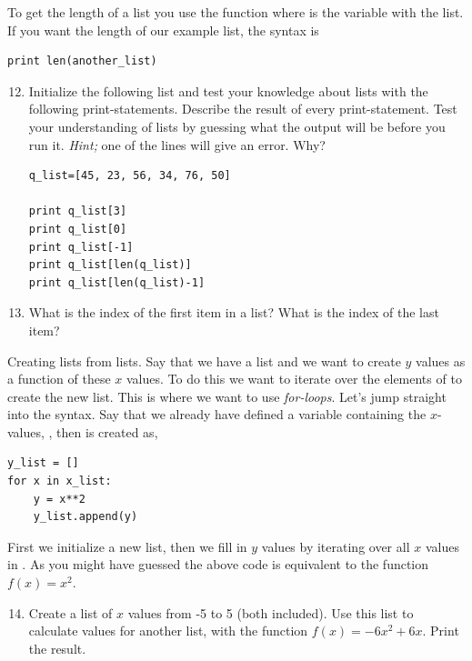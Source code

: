 \documentclass{article}
\begin{document}
To get the length of a list you use the function 
where  is the variable with the list.
If you want the length of our example list, the syntax is

\begin{lstlisting}
print len(another_list)
\end{lstlisting}


\begin{enumerate}
  \setcounter{enumi}{11}
  \item Initialize the following list and test your knowledge about
    lists with the following print-statements.
    Describe the result of every print-statement. Test your
    understanding of lists by guessing what the output will be before
    you run it. 
    {\em Hint;} one of the lines will give an error. Why?

\begin{lstlisting}
q_list=[45, 23, 56, 34, 76, 50]

print q_list[3]
print q_list[0]
print q_list[-1]
print q_list[len(q_list)]
print q_list[len(q_list)-1]
\end{lstlisting}

  \item What is the index of the first item in a list? What is the index of
    the last item?

\end{enumerate}

Creating lists from lists. Say that we have a list 
and we want to create $y$ values as a function of these $x$ values.
To do this we want to iterate over the elements of  to create the new list.
This is where we want to use {\em for-loops}.
Let's jump straight into the syntax. Say that we already
have defined a variable containing the $x$-values, ,
then  is created as,

\begin{lstlisting}
y_list = []
for x in x_list:
    y = x**2
    y_list.append(y)
\end{lstlisting}

First we initialize a new list,
then we fill in $y$ values by iterating over
all $x$ values in .
As you might have guessed the above code is equivalent to 
the function $f(x) = x^2$.\\

\begin{enumerate}
  \setcounter{enumi}{13}
  \item Create a list of $x$ values from -5 to 5 (both included). Use this list
    to calculate values for another list, with the function $f(x) = -6x^2 + 6x$.
    Print the result.

\end{enumerate}
\end{document}
